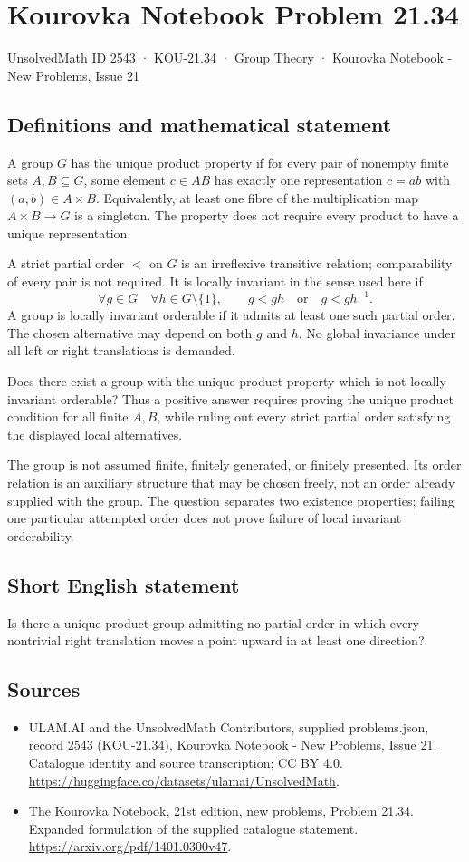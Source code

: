 \documentclass[11pt,a4paper]{article}
\begin{document}
\section*{Kourovka Notebook Problem 21.34}\label{2543}
{\small UnsolvedMath ID 2543 · KOU-21.34 · Group Theory · Kourovka Notebook - New Problems, Issue 21}
\subsection{Definitions and mathematical statement}
A group $G$ has the unique product property if for every pair of
nonempty finite sets $A,B\subseteq G$, some element $c\in AB$ has
exactly one representation $c=ab$ with $(a,b)\in A\times B$.
Equivalently, at least one fibre of the multiplication map
$A\times B\to G$ is a singleton. The property does not require every
product to have a unique representation.

A strict partial order $<$ on $G$ is an irreflexive transitive relation;
comparability of every pair is not required. It is locally invariant
in the sense used here if
\[
 \forall g\in G\quad\forall h\in G\setminus\{1\},\qquad
 g<gh\quad\text{or}\quad g<gh^{-1}.
\]
A group is locally invariant orderable if it admits at least one such
partial order. The chosen alternative may depend on both $g$ and $h$.
No global invariance under all left or right translations is demanded.

Does there exist a group with the unique product property which is not
locally invariant orderable? Thus a positive answer requires proving the
unique product condition for all finite $A,B$, while ruling out every
strict partial order satisfying the displayed local alternatives.

The group is not assumed finite, finitely generated, or finitely
presented. Its order relation is an auxiliary structure that may be
chosen freely, not an order already supplied with the group. The
question separates two existence properties; failing one particular
attempted order does not prove failure of local invariant orderability.
\subsection{Short English statement}
Is there a unique product group admitting no partial order in which every nontrivial right translation moves a point upward in at least one direction?
\subsection{Sources}
\begin{itemize}
\item[S1] ULAM.AI and the UnsolvedMath Contributors, supplied problems.json, record 2543 (KOU-21.34), Kourovka Notebook - New Problems, Issue 21. Catalogue identity and source transcription; CC BY 4.0.
\url{https://huggingface.co/datasets/ulamai/UnsolvedMath}.
\item[S2] The Kourovka Notebook, 21st edition, new problems, Problem 21.34. Expanded formulation of the supplied catalogue statement.
\url{https://arxiv.org/pdf/1401.0300v47}.
\end{itemize}
\end{document}
